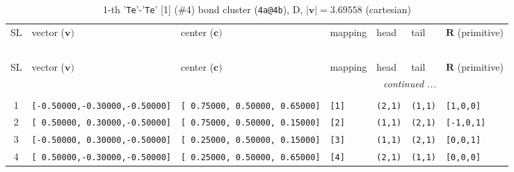 \documentclass[fleqn,10pt,landscape]{jsarticle}
\begin{document}
\begin{longtable}[l]{cllllll}
\captionsetup{justification=raggedright, singlelinecheck=off}
\caption{1-th '\texttt{Te}'-'\texttt{Te}' [1] (\#4) bond cluster (\texttt{4a@4b}), D, $|\bm{v}|=3.69558$ (cartesian)}
 \\
 \hline \hline
SL & vector ($\bm{v})$ & center ($\bm{c})$ & mapping & head & tail & $\bm{R}$ (primitive) \\ \hline \endfirsthead

\multicolumn{6}{l}{\tablename\ \thetable{}} \\
 \hline \hline
SL & vector ($\bm{v})$ & center ($\bm{c})$ & mapping & head & tail & $\bm{R}$ (primitive) \\ \hline \endhead

 \hline \hline
\multicolumn{6}{r}{\footnotesize\it continued ...} \\ \endfoot

 \hline \hline
\multicolumn{6}{r}{} \\ \endlastfoot

1 & \texttt{[-0.50000,-0.30000,-0.50000]} & \texttt{[ 0.75000, 0.50000, 0.65000]} & \texttt{[1]} & \texttt{(2,1)} & \texttt{(1,1)} & \texttt{[1,0,0]} \\ \hline
2 & \texttt{[ 0.50000, 0.30000,-0.50000]} & \texttt{[ 0.75000, 0.50000, 0.15000]} & \texttt{[2]} & \texttt{(1,1)} & \texttt{(2,1)} & \texttt{[-1,0,1]} \\ \hline
3 & \texttt{[-0.50000, 0.30000,-0.50000]} & \texttt{[ 0.25000, 0.50000, 0.15000]} & \texttt{[3]} & \texttt{(1,1)} & \texttt{(2,1)} & \texttt{[0,0,1]} \\ \hline
4 & \texttt{[ 0.50000,-0.30000,-0.50000]} & \texttt{[ 0.25000, 0.50000, 0.65000]} & \texttt{[4]} & \texttt{(2,1)} & \texttt{(1,1)} & \texttt{[0,0,0]} \\
\end{longtable}
\end{document}
